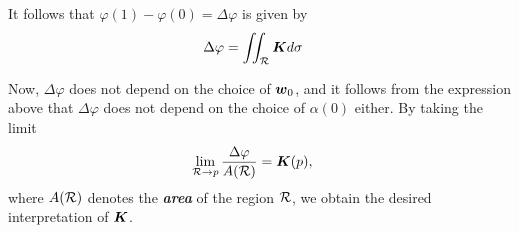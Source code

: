 \documentclass[11pt]{article}
\begin{document}
\begin{itemize}
\begin{remark}
It follows that $\varphi(1) - \varphi(0) = \Delta \varphi$ is given by
\begin{align}
 \Delta \varphi &= \iint_{{\mathcal R}}\boldsymbol{K}d\sigma \label{eqn: gaussian_curvature_angle_diff}
\end{align}

Now, $\Delta \varphi$ does not depend on the choice of $\boldsymbol{w}_0$, and it follows from the expression above that $\Delta \varphi$ does not depend on the choice of $\alpha(0)$ either. By taking the limit
\begin{align*}
\lim_{{\mathcal R} \rightarrow p}\frac{\Delta \varphi}{A({\mathcal R})} &= \boldsymbol{K}(p),
\end{align*} where $A({\mathcal R})$ denotes the \emph{\textbf{area}} of the region ${\mathcal R}$, we obtain the desired interpretation of $\boldsymbol{K}$.
\end{remark}
\end{itemize}
\end{document}
